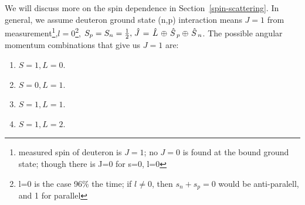 \documentclass{school-22.101-notes}
\begin{document}
 We will discuss more on the spin dependence in Section~\ref{spin-scattering}. 
In general, we assume deuteron ground state (n,p) interaction means $J=1$ from measurement\footnote{measured spin of deuteron is $J=1$; no $J=0$ is found at the bound ground state; though there is J=0 for s=0, l=0},$l=0$\footnote{l=0 is the case 96\% the time; if $l\neq 0$, then $s_n+s_p =0$ would be anti-paralell, and 1 for parallel}, $S_p = S_n = \frac{1}{2}, \left. \hat{J} \right. = \left. \hat{L} \right. \oplus \left. \hat{S} \right._p \oplus \left. \hat{S} \right._n$. The possible angular momentum combinations that give us $J=1$ are: 
\begin{enumerate}
\item $S=1, L=0$.
\item $S=0, L=1$. 
\item $S=1, L=1$. 
\item $S=1, L=2$.
\end{enumerate}
\end{document}
